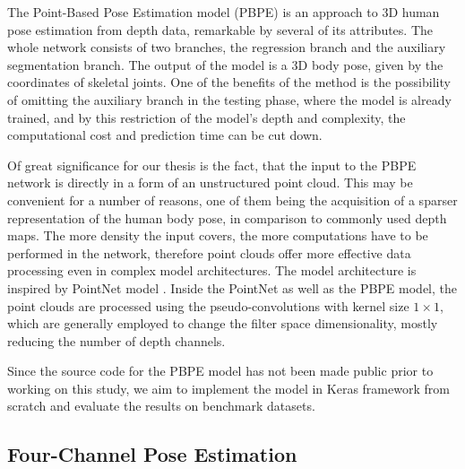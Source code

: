 The Point-Based Pose Estimation model (PBPE) \cite{Ali19} is an approach to 3D human pose estimation from depth data, remarkable by several of its attributes. The whole network consists of two branches, the regression branch and the auxiliary segmentation branch. The output of the model is a 3D body pose, given by the coordinates of skeletal joints. One of the benefits of the method is the possibility of omitting the auxiliary branch in the testing phase, where the model is already trained, and by this restriction of the model's depth and complexity, the computational cost and prediction time can be cut down.\par
\vspace{5mm}
\noindent Of great significance for our thesis is the fact, that the input to the PBPE network is directly in a form of an unstructured point cloud. This may be convenient for a number of reasons, one of them being the acquisition of a sparser representation of the human body pose, in comparison to commonly used depth maps. The more density the input covers, the more computations have to be performed in the network, therefore point clouds offer more effective data processing even in complex model architectures. The model architecture is inspired by PointNet model \cite{DBLP:journals/corr/QiSMG16}. Inside the PointNet as well as the PBPE model, the point clouds are processed using the pseudo-convolutions with kernel size $1 \times 1$, which are generally employed to change the filter space dimensionality, mostly reducing the number of depth channels.\par %
\vspace{5mm}
\noindent Since the source code for the PBPE model has not been made public prior to working on this study, we aim to implement the model in Keras framework from scratch and evaluate the results on benchmark datasets.

\subsection{Four-Channel Pose Estimation}

